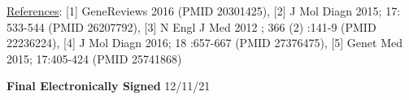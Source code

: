 \documentclass[10pt]{article}
\begin{document}
\hfill \parbox{19cm}{
\underline{References}: [1] GeneReviews 2016 (PMID 20301425), [2] J Mol Diagn 2015; 17: 533-544 (PMID 26207792), [3] N Engl J Med 2012 ; 366 (2) :141-9 (PMID 22236224), [4] J Mol Diagn 2016; 18 :657-667 (PMID 27376475), [5] Genet Med 2015; 17:405-424 (PMID 25741868)
}

\vfill

{\bf Final Electronically Signed} \hfill 12/11/21

\end{document}
